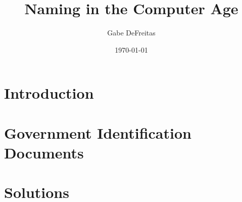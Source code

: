 \documentclass{report}
\title{Naming in the Computer Age}
\author{Gabe DeFreitas}
\date{\today}
\begin{document}
\maketitle
\tableofcontents

\chapter{Introduction}





\chapter{Government Identification Documents}





\chapter{Solutions}

\printbibliography
\end{document}
